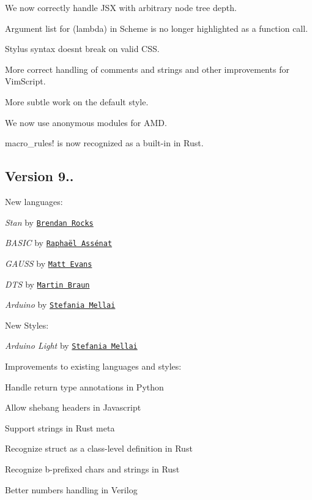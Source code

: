 \begin{DoxyItemize}
\item We now correctly handle J\+SX with arbitrary node tree depth.
\item Argument list for {\ttfamily (lambda)} in Scheme is no longer highlighted as a function call.
\item Stylus syntax doesn\textquotesingle{}t break on valid C\+SS.
\item More correct handling of comments and strings and other improvements for Vim\+Script.
\item More subtle work on the default style.
\item We now use anonymous modules for A\+MD.
\item {\ttfamily macro\+\_\+rules!} is now recognized as a built-\/in in Rust.
\end{DoxyItemize}

\subsection*{Version 9..}

New languages\+:


\begin{DoxyItemize}
\item {\itshape Stan} by \href{http://brendanrocks.com}{\tt Brendan Rocks}
\item {\itshape B\+A\+S\+IC} by \href{https://github.com/raphnet}{\tt Raphaël Assénat}
\item {\itshape G\+A\+U\+SS} by \href{https://github.com/matthewevans}{\tt Matt Evans}
\item {\itshape D\+TS} by \href{https://github.com/mbr0wn}{\tt Martin Braun}
\item {\itshape Arduino} by \href{https://github.com/smellai}{\tt Stefania Mellai}
\end{DoxyItemize}

New Styles\+:


\begin{DoxyItemize}
\item {\itshape Arduino Light} by \href{https://github.com/smellai}{\tt Stefania Mellai}
\end{DoxyItemize}

Improvements to existing languages and styles\+:


\begin{DoxyItemize}
\item Handle return type annotations in Python
\item Allow shebang headers in Javascript
\item Support strings in Rust meta
\item Recognize {\ttfamily struct} as a class-\/level definition in Rust
\item Recognize b-\/prefixed chars and strings in Rust
\item Better numbers handling in Verilog
\end{DoxyItemize}

